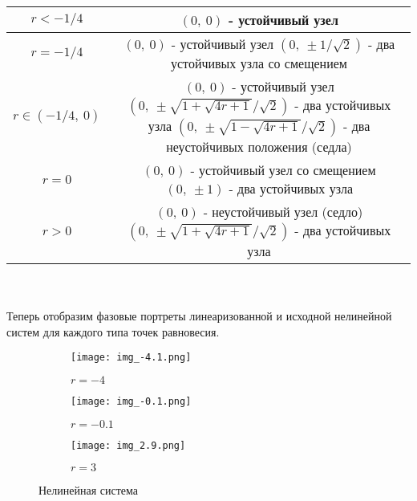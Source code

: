 \documentclass[12pt]{article}
\begin{document}
\begin{center}
\begin{tabular}{ |c|c| } 
 \hline
 $r < -1/4$ & $(0, \ 0)$ - устойчивый узел \\ 
  \hline
 $r = -1/4$ & \makecell{$(0, \ 0)$ - устойчивый узел \\ $(0, \ \pm 1/\sqrt{2})$ - два устойчивых узла со смещением}\\ 
  \hline
 $r \in (-1/4, \ 0)$ & \makecell{$(0, \ 0)$ - устойчивый узел \\ $(0, \ \pm \sqrt{1+\sqrt{4r+1}}/\sqrt{2})$ - два устойчивых узла \\ 
 $(0, \ \pm \sqrt{1-\sqrt{4r+1}}/\sqrt{2})$ - два неустойчивых положения (седла)}} \\ 
  \hline
 $r = 0$ & \makecell{
 $(0, \ 0)$ - устойчивый узел со смещением \\
 $(0, \ \pm 1)$ - два устойчивых узла \\
 } \\
  \hline
 $r > 0$ & \makecell{
 $(0, \ 0)$ - неустойчивый узел (седло) \\
 $(0, \ \pm \sqrt{1+\sqrt{4r+1}}/\sqrt{2})$ - два устойчивых узла \\
 } \\
 \hline
\end{tabular}
\end{center} \\
\ \\
Теперь отобразим фазовые портреты линеаризованной и исходной нелинейной систем для каждого типа точек равновесия. \\

\begin{figure}[H]
     \centering
     \begin{subfigure}[b]{0.3\textwidth}
         \centering
         \texttt{[image: img\_-4.1.png]}
         \caption{$r=-4$}
         \label{fig:img_-4.1.png}
     \end{subfigure}
     \hfill
     \begin{subfigure}[b]{0.3\textwidth}
         \centering
         \texttt{[image: img\_-0.1.png]}
         \caption{$r=-0.1$}
         \label{fig:img_-0.1.png}
     \end{subfigure}
     \hfill
     \begin{subfigure}[b]{0.3\textwidth}
         \centering
         \texttt{[image: img\_2.9.png]}
         \caption{$r=3$}
         \label{fig:img_2.9.png}
     \end{subfigure}
        \caption{Нелинейная система}
        \label{fig:three graphs}
\end{figure}
\end{document}
